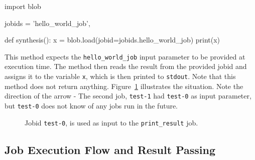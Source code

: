 \documentclass[a4paper]{article}
\begin{document}
\begin{python}
import blob
  
jobids = {'hello_world_job',}

def synthesis():
    x = blob.load(jobid=jobids.hello_world_job)
    print(x)
\end{python}

This method expects the \texttt{hello\_world\_job} input parameter to
be provided at execution time.  The method then reads the result from
the provided jobid and assigns it to the variable \texttt{x}, which is
then printed to \texttt{stdout}.  Note that this method does not
return anything.  Figure~\ref{fig:execflow-print-result} illustrates
the situation.  Note the direction of the arrow - The second job,
\texttt{test-1} had \texttt{test-0} as input parameter, but
\texttt{test-0} does not know of any jobs run in the future.

\begin{figure}[h!]
  \begin{center}
    
    \caption{Jobid \texttt{test-0}, is used as input to the
      \texttt{print\_result} job.}
    \label{fig:execflow-print-result}
  \end{center}
\end{figure}

\clearpage




\subsection{Job Execution Flow and Result Passing}
\end{document}
